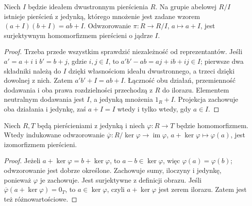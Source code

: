 \begin{twierdzenie}
\label{aa:tw:ring-quotient}
Niech $I$ będzie ideałem dwustronnym pierścienia $R$.
Na grupie abelowej $R/I$ istnieje pierścień z jedynką,
którego mnożenie jest zadane wzorem
$(a+I)(b+I)=ab+I$. Odwzorowanie
$\pi:R\to R/I$, $a\mapsto a+I$, jest surjektywnym
homomorfizmem pierścieni o jądrze $I$.
\end{twierdzenie}
\begin{proof}
Trzeba przede wszystkim sprawdzić niezależność od reprezentantów.
Jeśli $a'=a+i$ i $b'=b+j$, gdzie $i,j\in I$, to
$a'b'-ab=aj+ib+ij\in I$; pierwsze dwa składniki należą
do $I$ dzięki własnościom ideału dwustronnego,
a trzeci dzięki dowolnej z nich. Zatem $a'b'+I=ab+I$.
Łączność obu działań, przemienność dodawania i oba prawa
rozdzielności przechodzą z $R$ do ilorazu.
Elementem neutralnym dodawania jest $I$,
a jedynką mnożenia $1_R+I$. Projekcja zachowuje oba działania
i jedynkę, zaś $a+I=I$ wtedy i tylko wtedy, gdy $a\in I$.
\end{proof}

\begin{twierdzenie}
\label{aa:tw:ring-isomorphism}
Niech $R,T$ będą pierścieniami z jedynką i niech
$\varphi:R\to T$ będzie homomorfizmem. Wtedy indukowane odwzorowanie
$\overline\varphi:R/\ker\varphi\to\operatorname{im}\varphi$,
$a+\ker\varphi\mapsto\varphi(a)$, jest izomorfizmem pierścieni.
\end{twierdzenie}
\begin{proof}
Jeżeli $a+\ker\varphi=b+\ker\varphi$, to
$a-b\in\ker\varphi$, więc $\varphi(a)=\varphi(b)$;
odwzorowanie jest dobrze określone. Zachowuje sumy,
iloczyny i jedynkę, ponieważ $\varphi$ je zachowuje.
Jest surjektywne z definicji obrazu. Jeśli
$\overline\varphi(a+\ker\varphi)=0_T$, to
$a\in\ker\varphi$, czyli $a+\ker\varphi$ jest zerem
ilorazu. Zatem jest też różnowartościowe.
\end{proof}

